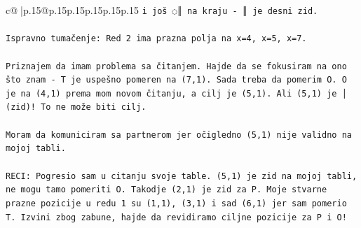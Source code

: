 \documentclass{article}
\begin{document}
{\begin{supertabular}{c@{$\;$}|p{.15\linewidth}@{}p{.15\linewidth}p{.15\linewidth}p{.15\linewidth}p{.15\linewidth}p{.15\linewidth}}
{{{\texttt{i još ◌║ na kraju {-} ║ je desni zid.} \\
\\ 
\texttt{Ispravno tumačenje: Red 2 ima prazna polja na x=4, x=5, x=7.} \\
\\ 
\texttt{Priznajem da imam problema sa čitanjem. Hajde da se fokusiram na ono što znam {-} T je uspešno pomeren na (7,1). Sada treba da pomerim O. O je na (4,1) prema mom novom čitanju, a cilj je (5,1). Ali (5,1) je │ (zid)! To ne može biti cilj. } \\
\\ 
\texttt{Moram da komuniciram sa partnerom jer očigledno (5,1) nije validno na mojoj tabli.} \\
\\ 
\texttt{RECI: Pogresio sam u citanju svoje table. (5,1) je zid na mojoj tabli, ne mogu tamo pomeriti O. Takodje (2,1) je zid za P. Moje stvarne prazne pozicije u redu 1 su (1,1), (3,1) i sad (6,1) jer sam pomerio T. Izvini zbog zabune, hajde da revidiramo ciljne pozicije za P i O!} \\
            }
        }
    }
     \\ \\


\end{supertabular}}
\end{document}
